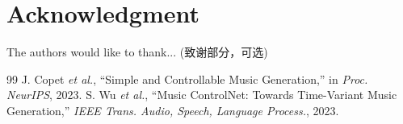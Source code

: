 \documentclass[10pt, conference, letterpaper]{IEEEtran}
\begin{document}
\section*{Acknowledgment}
The authors would like to thank... (致谢部分，可选)

\begin{thebibliography}{99}
 J. Copet \textit{et al.}, ``Simple and Controllable Music Generation,'' in \textit{Proc. NeurIPS}, 2023.
 S. Wu \textit{et al.}, ``Music ControlNet: Towards Time-Variant Music Generation,'' \textit{IEEE Trans. Audio, Speech, Language Process.}, 2023.
\end{thebibliography}
\end{document}
